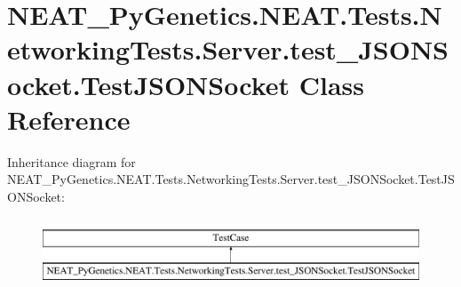 \hypertarget{classNEAT__PyGenetics_1_1NEAT_1_1Tests_1_1NetworkingTests_1_1Server_1_1test__JSONSocket_1_1TestJSONSocket}{}\section{N\+E\+A\+T\+\_\+\+Py\+Genetics.\+N\+E\+A\+T.\+Tests.\+Networking\+Tests.\+Server.\+test\+\_\+\+J\+S\+O\+N\+Socket.\+Test\+J\+S\+O\+N\+Socket Class Reference}
\label{classNEAT__PyGenetics_1_1NEAT_1_1Tests_1_1NetworkingTests_1_1Server_1_1test__JSONSocket_1_1TestJSONSocket}
Inheritance diagram for N\+E\+A\+T\+\_\+\+Py\+Genetics.\+N\+E\+A\+T.\+Tests.\+Networking\+Tests.\+Server.\+test\+\_\+\+J\+S\+O\+N\+Socket.\+Test\+J\+S\+O\+N\+Socket\+:\begin{figure}[H]
\begin{center}
\leavevmode
\includegraphics[height=2.000000cm]{classNEAT__PyGenetics_1_1NEAT_1_1Tests_1_1NetworkingTests_1_1Server_1_1test__JSONSocket_1_1TestJSONSocket}
\end{center}
\end{figure}
